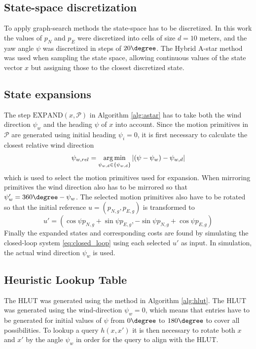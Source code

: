 \subsection{State-space discretization}
To apply graph-search methods the state-space has to be discretized. In this work the values of $p_N$ and $p_E$ were discretized into cells of size $d=10$ meters, and the 
yaw angle $\psi$ was discretized in steps of $20\degree$. The Hybrid A-star method was used when sampling the state space, allowing continuous values of the state vector $x$ but assigning those to the closest 
discretized state.

\subsection{State expansions}
The step $\text{EXPAND}(x,\mathcal{P})$ in Algorithm \ref{alg:astar} has to take both the wind direction $\psi_w$ and the heading $\psi$ of $x$ into account. 
Since the motion primitives in $\mathcal{P}$ are generated using initial heading $\psi_i=0$, it is first necessary to calculate the closest relative wind direction
\begin{equation}
    \psi_{w,rel}=\operatorname*{arg\,min}_{\psi_{w,d}\in\{\psi_{w,d}\}}|(\psi-\psi_w)-\psi_{w,d}|
\end{equation}
which is used to select the motion primitives used for expansion. When mirroring primitives the wind direction also has to be mirrored so that 
$\psi_w'=360\degree-\psi_w$. The selected motion primitives also have to be rotated so that the initial reference $u=(p_{N,g},p_{E,g})$ is transformed to 
\begin{equation}
    u'=(\cos\psi p_{N,g} + \sin\psi p_{E,g}, -\sin\psi p_{N,g} + \cos\psi p_{E,g})
\end{equation}
Finally the expanded states and corresponding costs are found by simulating the closed-loop system \eqref{eq:closed_loop} using each selected $u'$ as input. 
In simulation, the actual wind direction $\psi_w$ is used.

\subsection{Heuristic Lookup Table}
The HLUT was generated using the method in Algorithm \ref{alg:hlut}. The HLUT was generated using the wind-direction $\psi_w=0$, which means that 
entries have to be generated for initial values of $\psi$ from $0\degree$ to $180\degree$ to cover all possibilities. To lookup a query $h(x, x')$ it is then 
necessary to rotate both $x$ and $x'$ by the angle $\psi_w$ in order for the query to align with the HLUT. 

